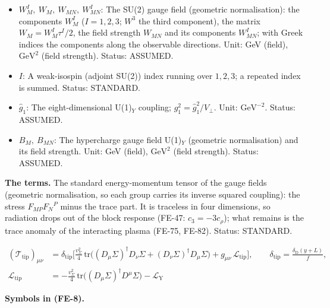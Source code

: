 \documentclass[
  10pt,
]{article}
\begin{document}
\begin{itemize}
  \(g_2^2 = \hat g_2^2/V_\perp\). Unit: \(\mathrm{GeV}^{-2}\). Status:
  ASSUMED.
\item
  \(W^I_M,\ W_M,\ W_{MN},\ W^I_{MN}\): The SU(2) gauge field (geometric
  normalisation): the components \(W^I_M\) (\(I = 1, 2, 3\); \(W^3\) the
  third component), the matrix \(W_M = W^I_M\tau^I/2\), the field
  strength \(W_{MN}\) and its components \(W^I_{MN}\); with Greek
  indices the components along the observable directions. Unit: GeV
  (field), \(\mathrm{GeV}^{2}\) (field strength). Status: ASSUMED.
\item
  \(I\): A weak-isospin (adjoint SU(2)) index running over \(1, 2, 3\);
  a repeated index is summed. Status: STANDARD.
\item
  \(\hat g_1\): The eight-dimensional U(1)\(_Y\) coupling;
  \(g_1^2 = \hat g_1^2/V_\perp\). Unit: \(\mathrm{GeV}^{-2}\). Status:
  ASSUMED.
\item
  \(B_M,\ B_{MN}\): The hypercharge gauge field U(1)\(_Y\) (geometric
  normalisation) and its field strength. Unit: GeV (field),
  \(\mathrm{GeV}^{2}\) (field strength). Status: ASSUMED.
\end{itemize}

\textbf{The terms.} The standard energy-momentum tensor of the gauge
fields (geometric normalisation, so each group carries its inverse
squared coupling): the stress \(F_{MP}F_N{}^P\) minus the trace part. It
is traceless in four dimensions, so radiation drops out of the block
response (FE-47: \(c_3 = -3c_\rho\)); what remains is the trace anomaly
of the interacting plasma (FE-75, FE-82). Status: STANDARD.

\[
\begin{aligned}
(\mathcal{T}_{\mathrm{tip}})_{\mu\nu} &=
 \delta_{\mathrm{tip}}\Big[\frac{v_\Sigma^2}{4}\,\mathrm{tr}\big((D_\mu\Sigma)^\dagger D_\nu\Sigma
 + (D_\nu\Sigma)^\dagger D_\mu\Sigma\big) + g_{\mu\nu}\,\mathcal{L}_{\mathrm{tip}}\Big],\qquad
 \delta_{\mathrm{tip}} = \frac{\delta_{\mathrm{D}}(y + L)}{f},\\
\mathcal{L}_{\mathrm{tip}} &= -\frac{v_\Sigma^2}{4}\,\mathrm{tr}\big((D_\mu\Sigma)^\dagger
 D^\mu\Sigma\big) - \mathcal{L}_{\mathrm{Y}}
\end{aligned} \tag{FE-8}
\]

\textbf{Symbols in (FE-8).}
\end{document}
